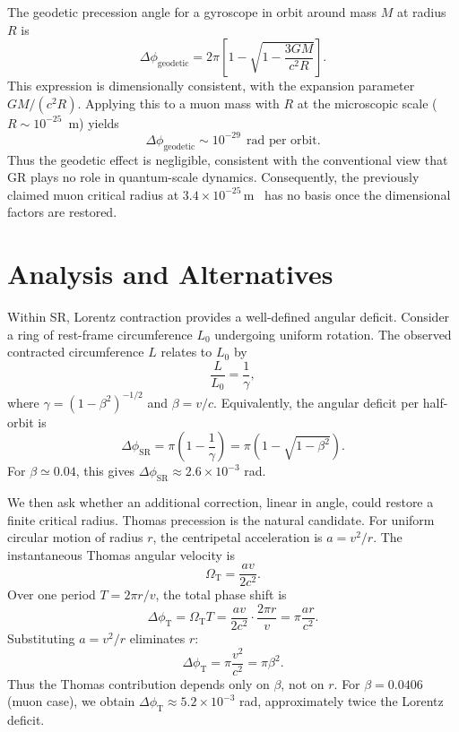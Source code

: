 \documentclass[%
 reprint,
 amsmath,amssymb,
 aps,
]{revtex4-1}
\numberwithin{equation}{section}
\begin{document}
The geodetic precession angle for a gyroscope in orbit around mass $M$ at radius $R$ is
\begin{equation}
\Delta \phi_{\mathrm{geodetic}} = 2\pi \left[ 1 - \sqrt{1-\frac{3GM}{c^2R}} \right].
\label{eq:geodetic_full}
\end{equation}
This expression is dimensionally consistent, with the expansion parameter $GM/(c^2R)$. 
Applying this to a muon mass with $R$ at the microscopic scale ($R \sim 10^{-25}$~m) yields
\begin{equation}
\Delta \phi_{\mathrm{geodetic}} \sim 10^{-29} \ \ \text{rad per orbit}.
\end{equation}
Thus the geodetic effect is negligible, consistent with the conventional view that GR plays no role in quantum-scale dynamics. 
Consequently, the previously claimed muon critical radius at $3.4 \times 10^{-25}\,\mathrm{m}$~\cite{zenodo.16905633} 
has no basis once the dimensional factors are restored.

\section{Analysis and Alternatives}

Within SR, Lorentz contraction provides a well-defined angular deficit. 
Consider a ring of rest-frame circumference $L_0$ undergoing uniform rotation. 
The observed contracted circumference $L$ relates to $L_0$ by 
\begin{equation}
\frac{L}{L_0} = \frac{1}{\gamma},
\end{equation}
where $\gamma=(1-\beta^2)^{-1/2}$ and $\beta=v/c$. 
Equivalently, the angular deficit per half-orbit is
\begin{equation}
\Delta \phi_{\mathrm{SR}} = \pi \left(1-\frac{1}{\gamma}\right) = \pi \left(1-\sqrt{1-\beta^2}\right).
\end{equation}
For $\beta\simeq 0.04$, this gives $\Delta \phi_{\mathrm{SR}}\approx 2.6\times 10^{-3}$ rad.

We then ask whether an additional correction, linear in angle, could restore a finite critical radius. 
Thomas precession is the natural candidate. For uniform circular motion of radius $r$, 
the centripetal acceleration is $a=v^2/r$. The instantaneous Thomas angular velocity is
\begin{equation}
\Omega_{\mathrm{T}} = \frac{a v}{2c^2}.
\end{equation}
Over one period $T=2\pi r/v$, the total phase shift is
\begin{equation}
\Delta \phi_{\mathrm{T}} = \Omega_{\mathrm{T}} T 
= \frac{a v}{2c^2}\cdot \frac{2\pi r}{v} 
= \pi \frac{a r}{c^2}.
\end{equation}
Substituting $a=v^2/r$ eliminates $r$:
\begin{equation}
\Delta \phi_{\mathrm{T}} = \pi \frac{v^2}{c^2} = \pi \beta^2.
\end{equation}
Thus the Thomas contribution depends only on $\beta$, not on $r$. 
For $\beta=0.0406$ (muon case), we obtain $\Delta \phi_{\mathrm{T}} \approx 5.2\times 10^{-3}$ rad, 
approximately twice the Lorentz deficit.
\end{document}
